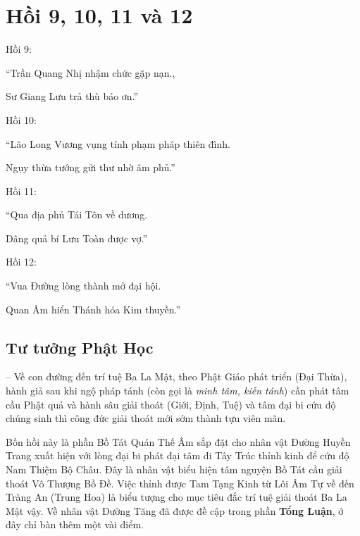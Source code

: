 \chapter{Hồi 9, 10, 11 và 12} %
\label{cha:hoi_9_10_11_và_12}
Hồi 9:

\begin{itshape}
``Trần Quang Nhị nhậm chức gặp nạn.,

Sư Giang Lưu trả thù báo ơn.''
\end{itshape}

Hồi 10:

\begin{itshape}
``Lão Long Vương vụng tính phạm pháp thiên đình.

Ngụy thừa tướng gửi thư nhờ âm phủ.''
\end{itshape}

Hồi 11:

\begin{itshape}
``Qua địa phủ Tái Tôn về dương.

Dâng quả bí Lưu Toàn được vợ.''
\end{itshape}

Hồi 12:

\begin{itshape}
``Vua Đường lòng thành mở đại hội.

Quan Âm hiển Thánh hóa Kim thuyền.''
\end{itshape}

\section{Tư tưởng Phật Học} %
\label{sec:9_phat_hoc}

-- Về con đường đến trí tuệ Ba La Mật, theo Phật Giáo phát triển (Đại Thừa), hành giả sau khi ngộ pháp tánh (còn gọi là \emph{minh tâm, kiến tánh}) cần phát tâm cầu Phật quả và hành sâu giải thoát (Giới, Định, Tuệ) và tâm đại bi cứu độ chúng sinh thì công đức giải thoát mới sớm thành tựu viên mãn.

Bốn hồi này là phần Bồ Tát Quán Thế Âm sắp đặt cho nhân vật Đường Huyền Trang xuất hiện với lòng đại bi phát đại tâm đi Tây Trúc thỉnh kinh để cứu độ Nam Thiệm Bộ Châu. Đây là nhân vật biểu hiện tâm nguyện Bồ Tát cầu giải thoát Vô Thượng Bồ Đề. Việc thỉnh được Tam Tạng Kinh từ Lôi Âm Tự về đến Tràng An (Trung Hoa) là biểu tượng cho mục tiêu đắc trí tuệ giải thoát Ba La Mật vậy. Về nhân vật Đường Tăng đã được đề cập trong phần {\bf Tổng Luận}, ở đây chỉ bàn thêm một vài điểm.

